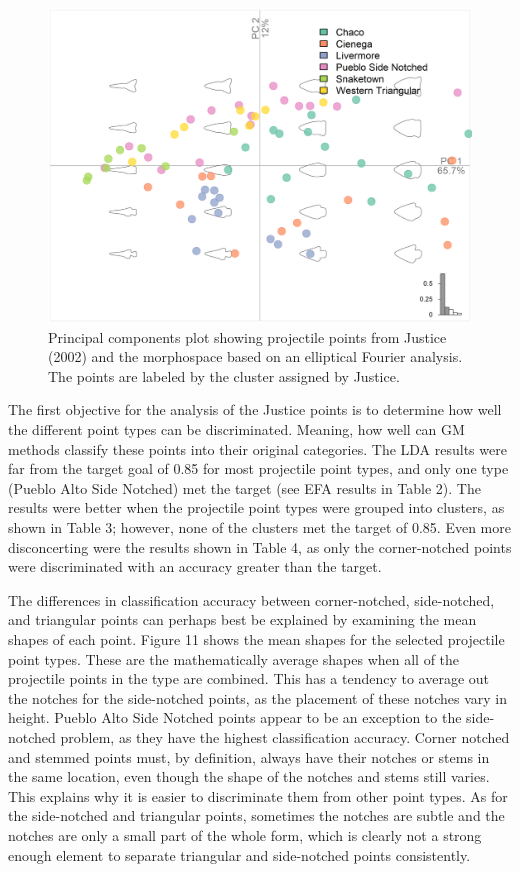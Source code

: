 \documentclass[a4paper]{article}
\begin{document}
\begin{figure}
\includegraphics[width=1\linewidth]{figures/JusticeEFAPCA} \caption{Principal components plot showing projectile points from Justice (2002) and the morphospace based on an elliptical Fourier analysis. The points are labeled by the cluster assigned by Justice.}\label{fig:JusticeEFAPCA}
\end{figure}

The first objective for the analysis of the Justice points is to determine how well the different point types can be discriminated. Meaning, how well can GM methods classify these points into their original categories. The LDA results were far from the target goal of 0.85 for most projectile point types, and only one type (Pueblo Alto Side Notched) met the target (see EFA results in Table 2). The results were better when the projectile point types were grouped into clusters, as shown in Table 3; however, none of the clusters met the target of 0.85. Even more disconcerting were the results shown in Table 4, as only the corner-notched points were discriminated with an accuracy greater than the target.

The differences in classification accuracy between corner-notched, side-notched, and triangular points can perhaps best be explained by examining the mean shapes of each point. Figure 11 shows the mean shapes for the selected projectile point types. These are the mathematically average shapes when all of the projectile points in the type are combined. This has a tendency to average out the notches for the side-notched points, as the placement of these notches vary in height. Pueblo Alto Side Notched points appear to be an exception to the side-notched problem, as they have the highest classification accuracy. Corner notched and stemmed points must, by definition, always have their notches or stems in the same location, even though the shape of the notches and stems still varies. This explains why it is easier to discriminate them from other point types. As for the side-notched and triangular points, sometimes the notches are subtle and the notches are only a small part of the whole form, which is clearly not a strong enough element to separate triangular and side-notched points consistently.
\end{document}
